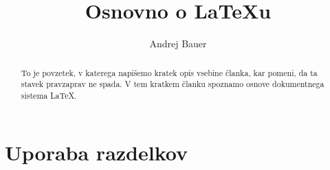\documentclass[a4paper]{article}
\begin{document}
\title{Osnovno o {\LaTeX}u}
\author{Andrej Bauer}



\maketitle

%
%

\begin{abstract}
  To je povzetek, v katerega napišemo kratek opis vsebine članka, kar pomeni, da ta stavek
  pravzaprav ne spada. V tem kratkem članku spoznamo osnove dokumentnega sistema {\LaTeX}.
\end{abstract}


\section{Uporaba razdelkov}

\end{document}
